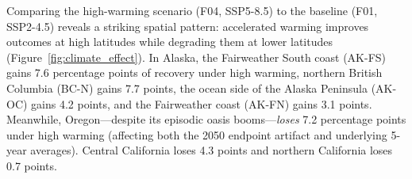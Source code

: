 Comparing the high-warming scenario (F04, SSP5-8.5) to the baseline (F01,
SSP2-4.5) reveals a striking spatial pattern: accelerated warming improves
outcomes at high latitudes while degrading them at lower latitudes
(Figure~\ref{fig:climate_effect}). In Alaska, the Fairweather South coast
(AK-FS) gains 7.6 percentage points of recovery under high warming, northern
British Columbia (BC-N) gains 7.7 points, the ocean side of the Alaska Peninsula
(AK-OC) gains 4.2 points, and the Fairweather coast (AK-FN) gains 3.1 points.
Meanwhile, Oregon---despite its episodic oasis booms---\textit{loses}
7.2 percentage points under high warming (affecting both the 2050 endpoint 
artifact and underlying 5-year averages). Central California loses 4.3 points and
northern California loses 0.7 points.

